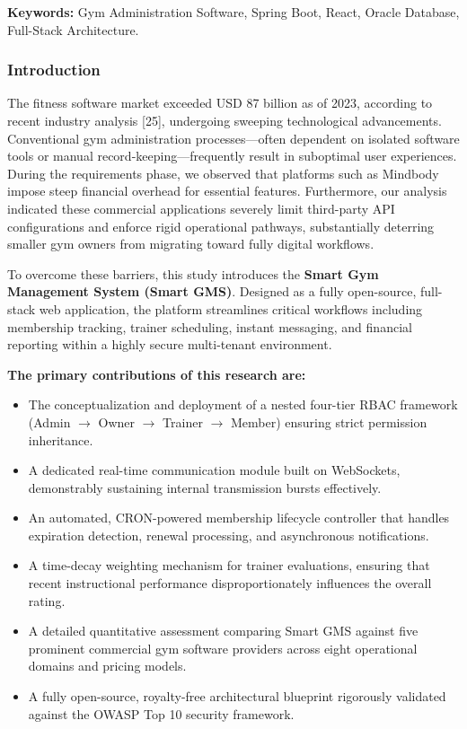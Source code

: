 \noindent\textbf{Keywords:} Gym Administration Software, Spring Boot,
React, Oracle Database, Full-Stack Architecture.

\subsubsection*{Introduction}\label{introduction}

The fitness software market exceeded USD 87 billion as of 2023,
according to recent industry analysis {[}25{]}, undergoing sweeping
technological advancements. Conventional gym administration
processes---often dependent on isolated software tools or manual
record-keeping---frequently result in suboptimal user experiences.
During the requirements phase, we observed that platforms such as
Mindbody impose steep financial overhead for essential features.
Furthermore, our analysis indicated these commercial applications
severely limit third-party API configurations and enforce rigid
operational pathways, substantially deterring smaller gym owners from
migrating toward fully digital workflows.

To overcome these barriers, this study introduces the \textbf{Smart Gym
Management System (Smart GMS)}. Designed as a fully open-source,
full-stack web application, the platform streamlines critical workflows
including membership tracking, trainer scheduling, instant messaging,
and financial reporting within a highly secure multi-tenant environment.

\textbf{The primary contributions of this research are:}

\begin{itemize}
\tightlist
\item
  The conceptualization and deployment of a nested four-tier RBAC
  framework (Admin \(\rightarrow\) Owner \(\rightarrow\) Trainer
  \(\rightarrow\) Member) ensuring strict permission inheritance.
\item
  A dedicated real-time communication module built on WebSockets,
  demonstrably sustaining internal transmission bursts effectively.
\item
  An automated, CRON-powered membership lifecycle controller that
  handles expiration detection, renewal processing, and asynchronous
  notifications.
\item
  A time-decay weighting mechanism for trainer evaluations, ensuring
  that recent instructional performance disproportionately influences
  the overall rating.
\item
  A detailed quantitative assessment comparing Smart GMS against five
  prominent commercial gym software providers across eight operational
  domains and pricing models.
\item
  A fully open-source, royalty-free architectural blueprint rigorously
  validated against the OWASP Top 10 security framework.
\end{itemize}

